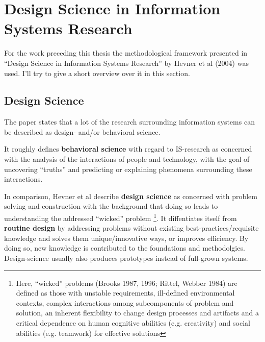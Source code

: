 \section{Design Science in Information Systems Research}

For the work preceding this thesis the methodological
framework presented in ``Design Science in Information
Systems Research'' by Hevner et al (2004) was used.
I'll try to give a short overview over it in this section.

\subsection{Design Science}

The paper states that a lot of the research surrounding information systems can be described as design- and/or behavioral science.

It roughly defines \textbf{behavioral science} with regard to IS-research as concerned with the analysis of the interactions of people and technology, with the goal of uncovering ``truths'' and predicting or explaining phenomena surrounding these interactions.

In comparison, Hevner et al describe \textbf{design science} as concerned with problem solving and construction with the background that doing so leads to understanding the addressed ``wicked'' problem \footnote{\label{ref:wicked}Here, ``wicked'' problems (Brooks 1987, 1996; Rittel, Webber 1984) are defined as those with unstable requirements, ill-defined environmental contexts, complex interactions among subcomponents of problem and solution, an inherent flexibility to change design processes and artifacts and a critical dependence on human cognitive abilities (e.g. creativity) and social abilities (e.g. teamwork) for effective solutions}. It diffentiates itself from \textbf{routine design} by addressing problems without existing best-practices/requisite knowledge and solves them unique/innovative ways, or improves efficiency. By doing so, new knowledge is contributed to the foundations and methodolgies. Design-science usually also produces prototypes instead of full-grown systems.




